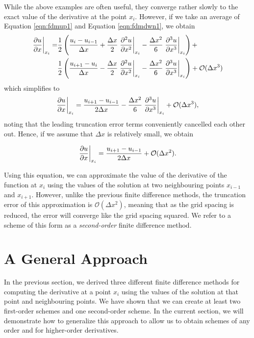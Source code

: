 While the above examples are often useful, they converge rather slowly to the exact value of the derivative at the point $x_i$. However, if we take an average of Equation \ref{eqn:fdmup1} and Equation \ref{eqn:fdmdwn1}, we obtain
\begin{equation}
	\begin{aligned}
	\left.\frac{\partial u}{\partial x}\right\rvert_{x_i}^{} = &\frac{1}{2}\left(\frac{u_i - u_{i-1}}{\Delta x} + \frac{\Delta x}{2} \left.\frac{\partial^2 u}{\partial x^2}\right\rvert_{x_i}^{} - \frac{\Delta x^2}{6} \left.\frac{\partial^3 u}{\partial x^3}\right\rvert_{x_i}^{} \right) + \\
	& \frac{1}{2}\left(\frac{u_{i+1} - u_{i}}{\Delta x} - \frac{\Delta x}{2} \left.\frac{\partial^2 u}{\partial x^2}\right\rvert_{x_i}^{} - \frac{\Delta x^2}{6} \left.\frac{\partial^3 u}{\partial x^3}\right\rvert_{x_i}^{} \right) + \mathcal{O}(\Delta x^3)
	\end{aligned}
\end{equation}
which simplifies to
\begin{equation}
	\left.\frac{\partial u}{\partial x}\right\rvert_{x_i}^{} = \frac{u_{i+1} - u_{i-1}}{2 \Delta x} - \frac{\Delta x^2}{6} \left.\frac{\partial^3 u}{\partial x^3}\right\rvert_{x_i}^{} + \mathcal{O}(\Delta x^3),
\end{equation}
noting that the leading truncation error terms conveniently cancelled each other out. Hence, if we assume that $\Delta x$ is relatively small, we obtain
\begin{eqBox}
\begin{equation}
	\left.\frac{\partial u}{\partial x}\right\rvert_{x_i}^{} = \frac{u_{i+1} - u_{i-1}}{2 \Delta x} + \mathcal{O}(\Delta x^2).
\end{equation}
\end{eqBox}
Using this equation, we can approximate the value of the derivative of the function at $x_i$ using the values of the solution at two neighbouring points $x_{i-1}$ and $x_{i+1}$. However, unlike the previous finite difference methods, the truncation error of this approximation is $\mathcal{O}(\Delta x^2)$, meaning that as the grid spacing is reduced, the error will converge like the grid spacing squared. We refer to a scheme of this form as a {\it second-order} finite difference method.

\section{A General Approach}
In the previous section, we derived three different finite difference methods for computing the derivative at a point $x_i$ using the values of the solution at that point and neighbouring points. We have shown that we can create at least two first-order schemes and one second-order scheme. In the current section, we will demonstrate how to generalize this approach to allow us to obtain schemes of any order and for higher-order derivatives.


